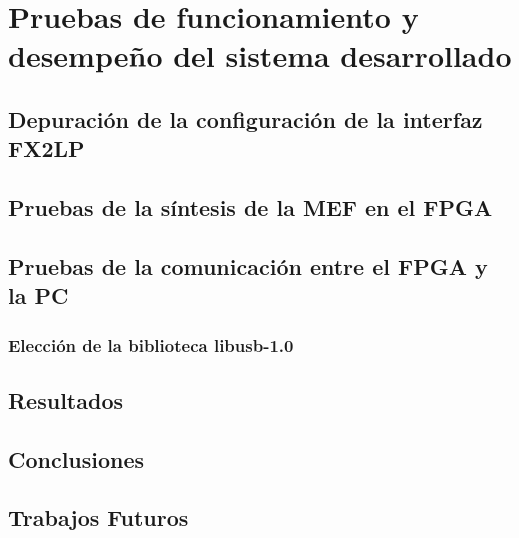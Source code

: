 \chapter{Pruebas de funcionamiento y desempeño del sistema desarrollado}
	\label{cap:verif}
	
	\section{Depuración de la configuración de la interfaz FX2LP}
		
	\section{Pruebas de la síntesis de la MEF en el FPGA}
		
	\section{Pruebas de la comunicación entre el FPGA y la PC}
		\subsection{Elección de la biblioteca libusb-1.0}
		
		
	\section{Resultados}
		
	\section{Conclusiones}
		
	\section{Trabajos Futuros}
		